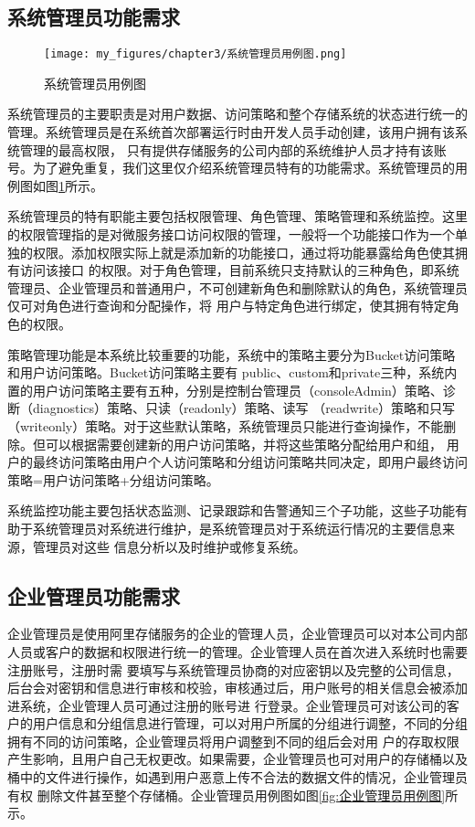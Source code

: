 \subsection{系统管理员功能需求}

\begin{figure}[h]
    \centering
    \texttt{[image: my\_figures/chapter3/系统管理员用例图.png]}
    \caption{系统管理员用例图}
    \label{fig:系统管理员用例图}
\end{figure}

系统管理员的主要职责是对用户数据、访问策略和整个存储系统的状态进行统一的管理。系统管理员是在系统首次部署运行时由开发人员手动创建，该用户拥有该系统管理的最高权限，
只有提供存储服务的公司内部的系统维护人员才持有该账号。为了避免重复，我们这里仅介绍系统管理员特有的功能需求。系统管理员的用例图如图\ref{fig:系统管理员用例图}所示。


系统管理员的特有职能主要包括权限管理、角色管理、策略管理和系统监控。这里的权限管理指的是对微服务接口访问权限的管理，一般将一个功能接口作为一个单独的权限。添加权限实际上就是添加新的功能接口，通过将功能暴露给角色使其拥有访问该接口
的权限。对于角色管理，目前系统只支持默认的三种角色，即系统管理员、企业管理员和普通用户，不可创建新角色和删除默认的角色，系统管理员仅可对角色进行查询和分配操作，将
用户与特定角色进行绑定，使其拥有特定角色的权限。

策略管理功能是本系统比较重要的功能，系统中的策略主要分为Bucket访问策略和用户访问策略。Bucket访问策略主要有
public、custom和private三种，系统内置的用户访问策略主要有五种，分别是控制台管理员（consoleAdmin）策略、诊断（diagnostics）策略、只读（readonly）策略、读写
（readwrite）策略和只写（writeonly）策略。对于这些默认策略，系统管理员只能进行查询操作，不能删除。但可以根据需要创建新的用户访问策略，并将这些策略分配给用户和组，
用户的最终访问策略由用户个人访问策略和分组访问策略共同决定，即用户最终访问策略=用户访问策略+分组访问策略。

系统监控功能主要包括状态监测、记录跟踪和告警通知三个子功能，这些子功能有助于系统管理员对系统进行维护，是系统管理员对于系统运行情况的主要信息来源，管理员对这些
信息分析以及时维护或修复系统。

\subsection{企业管理员功能需求}

企业管理员是使用阿里存储服务的企业的管理人员，企业管理员可以对本公司内部人员或客户的数据和权限进行统一的管理。企业管理人员在首次进入系统时也需要注册账号，注册时需
要填写与系统管理员协商的对应密钥以及完整的公司信息，后台会对密钥和信息进行审核和校验，审核通过后，用户账号的相关信息会被添加进系统，企业管理人员可通过注册的账号进
行登录。企业管理员可对该公司的客户的用户信息和分组信息进行管理，可以对用户所属的分组进行调整，不同的分组拥有不同的访问策略，企业管理员将用户调整到不同的组后会对用
户的存取权限产生影响，且用户自己无权更改。如果需要，企业管理员也可对用户的存储桶以及桶中的文件进行操作，如遇到用户恶意上传不合法的数据文件的情况，企业管理员有权
删除文件甚至整个存储桶。企业管理员用例图如图\ref{fig:企业管理员用例图}所示。

